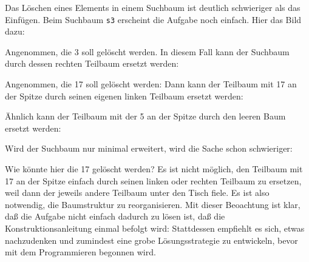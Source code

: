 Das Löschen eines Elements in einem Suchbaum ist deutlich schwieriger
als das Einfügen.  Beim Suchbaum \texttt{s3} erscheint die Aufgabe
noch einfach.  Hier das Bild dazu:
%
\begin{pspdf}
\begin{center}
  {
    \Tdot
  }
\end{center}
\end{pspdf}
% 
Angenommen, die 3 soll gelöscht werden. In diesem Fall kann der
Suchbaum durch dessen rechten Teilbaum ersetzt werden:
%
\begin{pspdf}
\begin{center}
\end{center}
\end{pspdf}
%
Angenommen, die 17 soll gelöscht werden: Dann kann der Teilbaum mit 17 an
der Spitze durch seinen eigenen linken Teilbaum ersetzt werden:
%
\begin{pspdf}
\begin{center}
  {
    \Tdot
  }
\end{center}
\end{pspdf}
%
Ähnlich kann der Teilbaum mit der 5 an der Spitze durch den leeren
Baum ersetzt werden:
%
\begin{pspdf}
\begin{center}
  {
    \Tdot
  }
\end{center}
\end{pspdf}
%
Wird der Suchbaum nur minimal erweitert, wird die Sache schon schwieriger:
%
\begin{pspdf}
\begin{center}
  {
    \Tdot
  }
\end{center}
\end{pspdf}
%
Wie könnte hier die 17 gelöscht werden? Es ist nicht möglich, den
Teilbaum mit 17 an der Spitze einfach durch seinen linken oder rechten
Teilbaum zu ersetzen, weil dann der jeweils andere Teilbaum unter den
Tisch fiele.  Es ist also notwendig, die Baumstruktur zu
reorganisieren.  Mit dieser Beoachtung ist klar, daß die Aufgabe nicht
einfach dadurch zu lösen ist, daß die Konstruktionsanleitung einmal
befolgt wird: Stattdessen empfiehlt es sich, etwas nachzudenken und
zumindest eine grobe Lösungsstrategie zu entwickeln, bevor mit dem
Programmieren begonnen wird.

